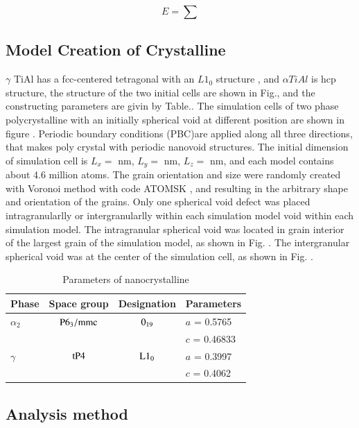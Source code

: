 \documentclass[times]{elsarticle}
\begin{document}
\begin{equation} \label{eq:eam} 
	E= \displaystyle\sum
\end{equation}

\subsection{Model Creation of Crystalline}
$\gamma $ TiAl has a fcc-centered tetragonal with an $L1_0$ structure \cite{}, and $\alpha TiAl$ is hcp structure, the structure of the two initial cells are shown in Fig.\cite{}, and the constructing parameters are givin by Table.\cite{}. The simulation cells of two phase polycrystalline with an initially spherical void at different position are shown in figure \cite{}. Periodic boundary conditions (PBC)are applied along all three directions, that makes poly crystal with periodic nanovoid structures. The initial dimension of simulation cell is  $L_x = $ nm, $L_y = $ nm, $L_z = $ nm, and each model contains about 4.6 million atoms. The grain orientation and size were randomly created with Voronoi method with code ATOMSK \cite{}, and resulting in the arbitrary shape and orientation of the grains. Only one spherical void defect was placed intragranularlly or intergranularlly within each simulation model void within each simulation model. The intragranular spherical void was located in grain interior of the largest grain of the simulation model, as shown in Fig. \cite{}. The intergranular spherical void was at the center of the simulation cell, as shown in Fig. \cite{}.



\begin{table}[h]
\centering
\caption{Parameters of  nanocrystalline}

\begin{tabular}{l c c l}
\hline
			Phase			& Space group		& Designation		& Parameters \\
			\hline
			$\alpha_2$		& $\rm P6_3/mmc$ 	& $\rm 0_{19}$ 		& $a$ = 0.5765 \\
							&					&					& $c$ = 0.46833 \\
			$\gamma$		& $\rm tP4$ 		& $\rm L1_0$		& $a$ = 0.3997 \\
			 				&					&					& $c$ = 0.4062 \\			
			\hline
\end{tabular}
	\label{tab:lattice_parameter}
\end{table}
 
\subsection{Analysis method}
\end{document}
